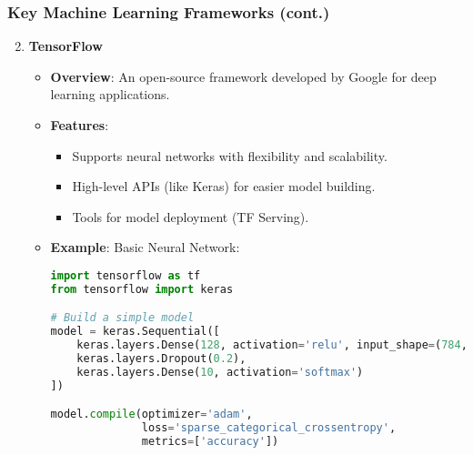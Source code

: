 \documentclass[aspectratio=169]{beamer}
\begin{document}
\begin{frame}[fragile]
    \frametitle{Key Machine Learning Frameworks (cont.)}
    
    \begin{enumerate}
        \setcounter{enumi}{1}
        \item \textbf{TensorFlow}
            \begin{itemize}
                \item \textbf{Overview}: An open-source framework developed by Google for deep learning applications.
                \item \textbf{Features}:
                    \begin{itemize}
                        \item Supports neural networks with flexibility and scalability.
                        \item High-level APIs (like Keras) for easier model building.
                        \item Tools for model deployment (TF Serving).
                    \end{itemize}
                \item \textbf{Example}: Basic Neural Network:
                \begin{lstlisting}[language=Python]
import tensorflow as tf
from tensorflow import keras

# Build a simple model
model = keras.Sequential([
    keras.layers.Dense(128, activation='relu', input_shape=(784,)),
    keras.layers.Dropout(0.2),
    keras.layers.Dense(10, activation='softmax')
])

model.compile(optimizer='adam',
              loss='sparse_categorical_crossentropy',
              metrics=['accuracy'])
                \end{lstlisting}
            \end{itemize}
    \end{enumerate}
\end{frame}
\end{document}
